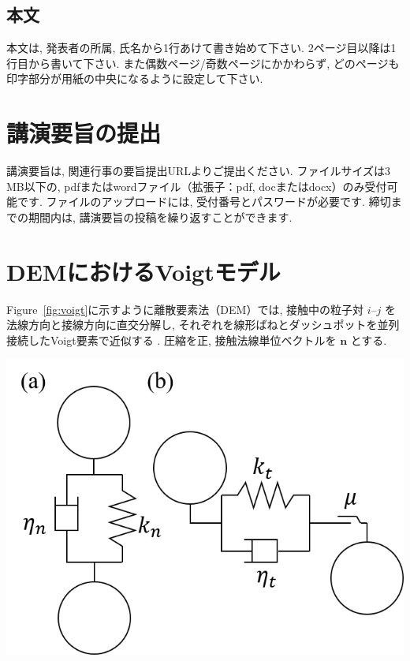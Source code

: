 \documentclass[a4paper,10pt,twocolumn]{ltjsarticle}
\newcommand{\refFigure}[1]{Figure~\ref{#1}}
\begin{document}
\subsection{本文}
本文は, 発表者の所属, 氏名から1行あけて書き始めて下さい. 2ページ目以降は1行目から書いて下さい. また偶数ページ/奇数ページにかかわらず, どのページも印字部分が用紙の中央になるように設定して下さい.

\par{}


\section{講演要旨の提出}
講演要旨は, 関連行事の要旨提出URLよりご提出ください. ファイルサイズは3\,MB以下の, pdfまたはwordファイル（拡張子：pdf, docまたはdocx）のみ受付可能です. ファイルのアップロードには, 受付番号とパスワードが必要です. 締切までの期間内は, 講演要旨の投稿を繰り返すことができます.

\par{}


\section{DEMにおけるVoigtモデル}
\refFigure{fig:voigt}に示すように離散要素法（DEM）では, 接触中の粒子対 $i$–$j$ を法線方向と接線方向に直交分解し, それぞれを線形ばねとダッシュポットを並列接続したVoigt要素で近似する \cite{Cundall1979}. 圧縮を正, 接触法線単位ベクトルを $\bm n$ とする.

\noindent\begin{minipage}{\columnwidth}\centering
  \includegraphics[width=\columnwidth]{voigt_model}
  \label{fig:voigt}
\end{minipage}
\end{document}
